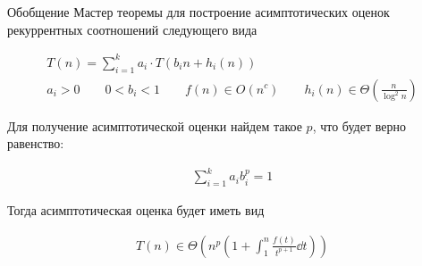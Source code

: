 
Обобщение Мастер теоремы для построение асимптотических оценок рекуррентных
соотношений следующего вида

\begin{align*}
  T(n) = \sum_{i = 1}^{k} a_{i} \cdot T(b_{i} n + h_{i}(n)) \\
  a_{i} > 0 \qquad
  0 < b_{i} < 1 \qquad
  f(n) \in O(n^{c}) \qquad
  h_{i}(n) \in \Theta \left(\frac{n}{\log^{2} n}\right)
\end{align*}

Для получение асимптотической оценки найдем такое \(p\), что будет верно
равенство:

\begin{align*}
  \sum_{i = 1}^{k} a_{i} b_{i}^{p} = 1
\end{align*}

Тогда асимптотическая оценка будет иметь вид

\begin{align*}
  T(n) \in \Theta \left(
    n^{p} \left( 1 + \int_{1}^{n} \frac{f(t)}{t^{p + 1}} \dd t \right)
  \right)
\end{align*}

